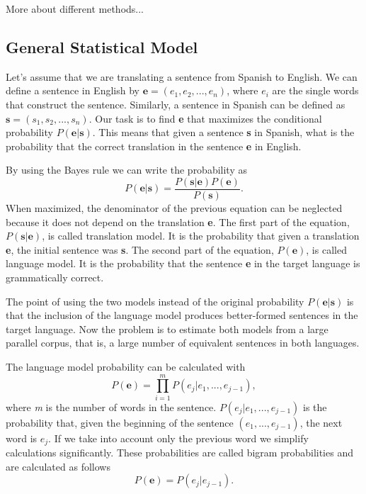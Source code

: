 \documentclass[12pt]{article}
\begin{document}
More about different methods...




\subsection{General Statistical Model}
Let's assume that we are translating a sentence from Spanish to English. 
We can define a sentence in English by $\mathbf e = (e_1, e_2, ..., e_n)$, where $e_i$ are the single words that construct the sentence.
Similarly, a sentence in Spanish can be defined as $\mathbf{s} = (s_1, s_2, ..., s_n)$.
Our task is to find \textbf{e} that maximizes the conditional probability $P(\mathbf{e}|\mathbf{s})$.
This means that given a sentence \textbf{s} in Spanish, what is the probability that the correct translation in the sentence \textbf{e} in English.

By using the Bayes rule we can write the probability as
\begin{equation}
P(\mathbf{e}|\mathbf{s}) = \frac{P(\mathbf{s}|\mathbf{e}) P(\mathbf{e})}{P(\mathbf{s})}.
\end{equation}
When maximized, the denominator of the previous equation can be neglected because it does not depend on the translation \textbf{e}.
The first part of the equation, $P(\mathbf{s}|\mathbf{e})$, is called translation model.
It is the probability that given a translation \textbf{e}, the initial sentence was \textbf{s}.
The second part of the equation, $P(\mathbf{e})$, is called language model.
It is the probability that the sentence \textbf{e} in the target language is grammatically correct.

The point of using the two models instead of the original probability $P(\mathbf{e}|\mathbf{s})$ is that the inclusion of the language model produces better-formed sentences in the target language. 
Now the problem is to estimate both models from a large parallel corpus, that is, a large number of equivalent sentences in both languages.

The language model probability can be calculated with
\begin{equation}
P(\mathbf{e}) = \prod_{i=1}^m P(e_j | e_1, ..., e_{j-1}),
\end{equation}
where \emph{m} is the number of words in the sentence. 
$P(e_j | e_1, ..., e_{j-1})$ is the probability that, given the beginning of the sentence $(e_1, ..., e_{j-1})$, the next word is $e_j$.
If we take into account only the previous word we simplify calculations significantly.
These probabilities are called bigram probabilities and are calculated as follows
\begin{equation}
P(\mathbf{e}) = P(e_j | e_{j-1}).
\end{equation}
\end{document}
